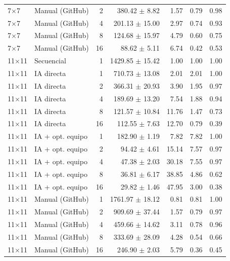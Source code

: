 \begin{tabular}{llrrrrr}
7$\times$7 & Manual (GitHub) & 2 & 380.42 $\pm$ 8.82 & 1.57 & 0.79 & 0.98 \\
7$\times$7 & Manual (GitHub) & 4 & 201.13 $\pm$ 15.00 & 2.97 & 0.74 & 0.93 \\
7$\times$7 & Manual (GitHub) & 8 & 124.68 $\pm$ 15.97 & 4.79 & 0.60 & 0.75 \\
7$\times$7 & Manual (GitHub) & 16 & 88.62 $\pm$ 5.11 & 6.74 & 0.42 & 0.53 \\
\midrule
11$\times$11 & Secuencial & 1 & 1429.85 $\pm$ 15.42 & 1.00 & 1.00 & 1.00 \\
11$\times$11 & IA directa & 1 & 710.73 $\pm$ 13.08 & 2.01 & 2.01 & 1.00 \\
11$\times$11 & IA directa & 2 & 366.31 $\pm$ 20.93 & 3.90 & 1.95 & 0.97 \\
11$\times$11 & IA directa & 4 & 189.69 $\pm$ 13.20 & 7.54 & 1.88 & 0.94 \\
11$\times$11 & IA directa & 8 & 121.57 $\pm$ 10.84 & 11.76 & 1.47 & 0.73 \\
11$\times$11 & IA directa & 16 & 112.55 $\pm$ 7.63 & 12.70 & 0.79 & 0.39 \\
11$\times$11 & IA + opt. equipo & 1 & 182.90 $\pm$ 1.19 & 7.82 & 7.82 & 1.00 \\
11$\times$11 & IA + opt. equipo & 2 & 94.42 $\pm$ 4.61 & 15.14 & 7.57 & 0.97 \\
11$\times$11 & IA + opt. equipo & 4 & 47.38 $\pm$ 2.03 & 30.18 & 7.55 & 0.97 \\
11$\times$11 & IA + opt. equipo & 8 & 36.81 $\pm$ 6.17 & 38.85 & 4.86 & 0.62 \\
11$\times$11 & IA + opt. equipo & 16 & 29.82 $\pm$ 1.46 & 47.95 & 3.00 & 0.38 \\
11$\times$11 & Manual (GitHub) & 1 & 1761.97 $\pm$ 18.12 & 0.81 & 0.81 & 1.00 \\
11$\times$11 & Manual (GitHub) & 2 & 909.69 $\pm$ 37.44 & 1.57 & 0.79 & 0.97 \\
11$\times$11 & Manual (GitHub) & 4 & 459.66 $\pm$ 14.62 & 3.11 & 0.78 & 0.96 \\
11$\times$11 & Manual (GitHub) & 8 & 333.69 $\pm$ 28.09 & 4.28 & 0.54 & 0.66 \\
11$\times$11 & Manual (GitHub) & 16 & 246.90 $\pm$ 2.03 & 5.79 & 0.36 & 0.45 \\
\bottomrule
\end{tabular}
